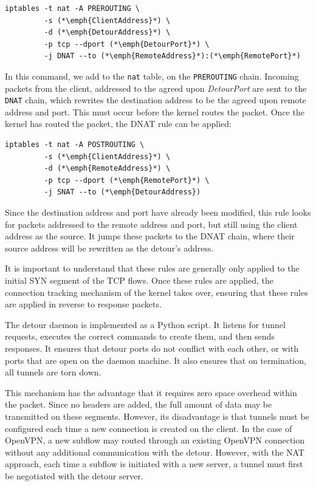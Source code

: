 \documentclass{cwru}
\begin{document}
\begin{lstlisting}
iptables -t nat -A PREROUTING \
         -s (*\emph{ClientAddress}*) \
         -d (*\emph{DetourAddress}*) \
         -p tcp --dport (*\emph{DetourPort}*) \
         -j DNAT --to (*\emph{RemoteAddress}*):(*\emph{RemotePort}*)
\end{lstlisting}

In this command, we add to the \texttt{nat} table, on the \texttt{PREROUTING}
chain. Incoming packets from the client, addressed to the agreed upon
\textit{DetourPort} are sent to the \texttt{DNAT} chain, which rewrites the
destination address to be the agreed upon remote address and port. This must
occur before the kernel routes the packet. Once the kernel has routed the
packet, the DNAT rule can be applied:

\begin{lstlisting}
iptables -t nat -A POSTROUTING \
         -s (*\emph{ClientAddress}*) \
         -d (*\emph{RemoteAddress}*) \
         -p tcp --dport (*\emph{RemotePort}*) \
         -j SNAT --to (*\emph{DetourAddress})
\end{lstlisting}

Since the destination address and port have already been modified, this rule
looks for packets addressed to the remote address and port, but still using the
client address as the source. It jumps these packets to the DNAT chain, where
their source address will be rewritten as the detour's address.

It is important to understand that these rules are generally only applied to the
initial SYN segment of the TCP flows. Once these rules are applied, the
connection tracking mechanism of the kernel takes over, ensuring that these
rules are applied in reverse to response packets.

The detour daemon is implemented as a Python script. It listens for tunnel
requests, executes the correct commands to create them, and then sends
responses. It ensures that detour ports do not conflict with each other, or with
ports that are open on the daemon machine. It also ensures that on termination,
all tunnels are torn down.

This mechanism has the advantage that it requires zero space overhead within the
packet. Since no headers are added, the full amount of data may be transmitted
on these segments. However, its disadvantage is that tunnels must be configured
each time a new connection is created on the client. In the case of OpenVPN, a
new subflow may routed through an existing OpenVPN connection without any
additional communication with the detour. However, with the NAT approach, each
time a subflow is initiated with a new server, a tunnel must first be negotiated
with the detour server.
\end{document}
